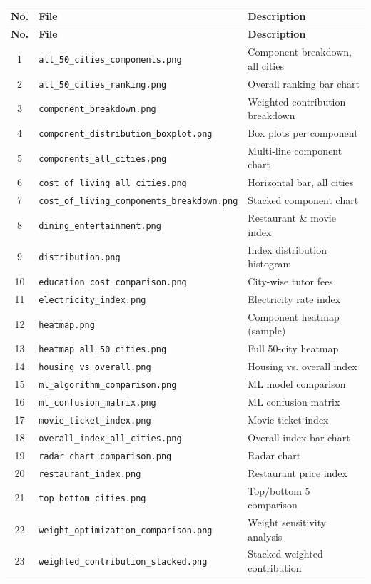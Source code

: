 \documentclass[12pt,a4paper]{article}
\begin{document}
\begin{longtable}{cll}
  \toprule
  \textbf{No.} & \textbf{File} & \textbf{Description} \\
  \midrule
  \endfirsthead
  \toprule
  \textbf{No.} & \textbf{File} & \textbf{Description} \\
  \midrule
  \endhead
  1  & \texttt{all\_50\_cities\_components.png}          & Component breakdown, all cities \\
  2  & \texttt{all\_50\_cities\_ranking.png}             & Overall ranking bar chart \\
  3  & \texttt{component\_breakdown.png}                 & Weighted contribution breakdown \\
  4  & \texttt{component\_distribution\_boxplot.png}     & Box plots per component \\
  5  & \texttt{components\_all\_cities.png}              & Multi-line component chart \\
  6  & \texttt{cost\_of\_living\_all\_cities.png}        & Horizontal bar, all cities \\
  7  & \texttt{cost\_of\_living\_components\_breakdown.png} & Stacked component chart \\
  8  & \texttt{dining\_entertainment.png}                & Restaurant \& movie index \\
  9  & \texttt{distribution.png}                         & Index distribution histogram \\
  10 & \texttt{education\_cost\_comparison.png}          & City-wise tutor fees \\
  11 & \texttt{electricity\_index.png}                   & Electricity rate index \\
  12 & \texttt{heatmap.png}                              & Component heatmap (sample) \\
  13 & \texttt{heatmap\_all\_50\_cities.png}             & Full 50-city heatmap \\
  14 & \texttt{housing\_vs\_overall.png}                 & Housing vs. overall index \\
  15 & \texttt{ml\_algorithm\_comparison.png}            & ML model comparison \\
  16 & \texttt{ml\_confusion\_matrix.png}                & ML confusion matrix \\
  17 & \texttt{movie\_ticket\_index.png}                 & Movie ticket index \\
  18 & \texttt{overall\_index\_all\_cities.png}          & Overall index bar chart \\
  19 & \texttt{radar\_chart\_comparison.png}             & Radar chart \\
  20 & \texttt{restaurant\_index.png}                    & Restaurant price index \\
  21 & \texttt{top\_bottom\_cities.png}                  & Top/bottom 5 comparison \\
  22 & \texttt{weight\_optimization\_comparison.png}     & Weight sensitivity analysis \\
  23 & \texttt{weighted\_contribution\_stacked.png}      & Stacked weighted contribution \\
  \bottomrule
\end{longtable}
\end{document}
